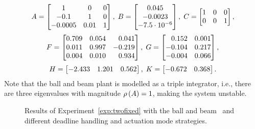\begin{equation*}
    A = \begin{bmatrix}
        1 & 0 & 0 \\
        -0.1 & 1 & 0 \\
        -0.0005 & 0.01 & 1
    \end{bmatrix}, \; B = \begin{bmatrix}
        0.045 \\
        -0.0023 \\
        -7.5\cdot 10^{-6}
    \end{bmatrix}, \;
    C = \begin{bmatrix}
        1 & 0 & 0 \\
        0 & 0 & 1
    \end{bmatrix},
\end{equation*}
\begin{equation*}
    F = \begin{bmatrix}
        0.709  & 0.054 &  \phantom{+}0.041 \\
        0.011  & 0.997 & -0.219 \\
        0.004  & 0.010 &  \phantom{+}0.934
    \end{bmatrix}, \; G = \begin{bmatrix}
        \phantom{+}0.152  & 0.001 \\
        -0.104 & 0.217 \\
        -0.004 & 0.066 \\
    \end{bmatrix},
\end{equation*}
\begin{equation*}
    H = \begin{bmatrix}
        -2.433 & 1.201 & 0.562
    \end{bmatrix}, \; K = \begin{bmatrix}
        -0.672 & 0.368
    \end{bmatrix}.
\end{equation*}
%
Note that the ball and beam plant is modelled as a triple integrator, i.e., there are three eigenvalues with magnitude $\rho\left( A \right) = 1$, making the system unstable.

\begin{figure}[t]
    \centering
    \caption{Results of Experiment~\ref{exp:twofixed} with the ball and beam~\cite{Vreman:2022} and different deadline handling and actuation mode strategies.}
    \label{fig:nils-fix2}
\end{figure}

